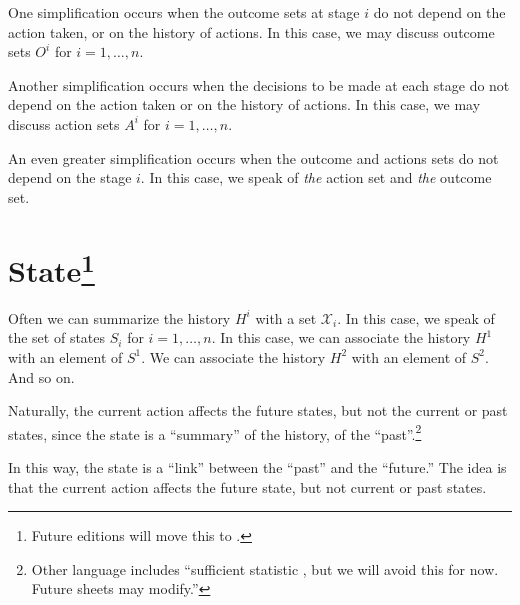 One simplification occurs when the outcome sets at stage $i$ do not depend on the action taken, or on the history of actions.
In this case, we may discuss outcome sets $O^i$ for $i = 1, \dots , n$.

Another simplification occurs when the decisions to be made at each stage do not depend on the action taken or on the history of actions.
In this case, we may discuss action sets $A^i$ for $i = 1, \dots , n$.

An even greater simplification occurs when the outcome and actions sets do not depend on the stage $i$.
In this case, we speak of \textit{the} action set and \textit{the} outcome set.

\section*{State\footnote{Future editions will move this to .}}

Often we can summarize the history $H^i$ with a set $\mathcal{X} _i$.
In this case, we speak of the set of states $S_i$ for $i = 1, \dots , n$.
In this case, we can associate the history $H^1$ with an element of $S^1$.
We can associate the history $H^2$ with an element of $S^2$.
And so on.

Naturally, the current action affects the future states, but not the current or past states, since the state is a ``summary'' of the history, of the ``past''.\footnote{Other language includes ``sufficient statistic , but we will avoid this for now. Future sheets may modify.''}

In this way, the state is a ``link'' between the ``past'' and the ``future.''
The idea is that the current action affects the future state, but not current or past states.

